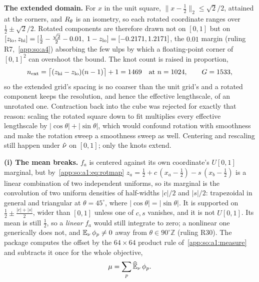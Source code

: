 \textbf{The extended domain.} For $x$ in the unit square,
$\|x-\tfrac12\|_2\le\sqrt2/2$, attained at the corners, and $R_\theta$ is an
isometry, so each rotated coordinate ranges over $\tfrac12\pm\sqrt2/2$.
Rotated components are therefore drawn not on $[0,1]$ but on
$[z_{\mathrm{lo}},z_{\mathrm{hi}}]
=[\tfrac12-\tfrac{\sqrt2}{2}-0.01,\;1-z_{\mathrm{lo}}]
=[-0.2171,1.2171]$, the $0.01$ margin (ruling R7,~\ref{app:so:a4})
absorbing the few ulps by which a floating-point corner of ${[0,1]}^2$ can
overshoot the bound. The knot count is raised in proportion,
\begin{equation}\label{app:so:a1:eq:next}
  n_{\mathrm{ext}}=\bigl\lceil(z_{\mathrm{hi}}-z_{\mathrm{lo}})(n-1)\bigr\rceil+1
       =1469
  \quad\text{at }n=1024,
  \qquad G=1533,
\end{equation}
so the extended grid's spacing is no coarser than the unit grid's and a
rotated component keeps the resolution, and hence the effective lengthscale,
of an unrotated one. Contraction back into the cube was rejected for exactly
that reason: scaling the rotated square down to fit multiplies every effective
lengthscale by $|\cos\theta|+|\sin\theta|$, which would confound rotation with
smoothness and make the rotation sweep a smoothness sweep as well. Centering
and rescaling still happen under $\hat\nu$ on $[0,1]$; only the knots extend.

\textbf{(i) The mean breaks.} $f_a$ is centered against its own coordinate's
$U[0,1]$ marginal, but by~\eqref{app:so:a1:eq:rotmap}
$z_a=\tfrac12+c\,(x_a-\tfrac12)-s\,(x_b-\tfrac12)$ is a linear combination of
two independent uniforms, so its marginal is the convolution of two uniform
densities of half-widths $|c|/2$ and $|s|/2$: trapezoidal in general and
triangular at $\theta=45^\circ$, where $|\cos\theta|=|\sin\theta|$. It is
supported on $\tfrac12\pm\tfrac{|c|+|s|}{2}$, wider than $[0,1]$ unless one of
$c,s$ vanishes, and it is not $U[0,1]$. Its mean is still $\tfrac12$, so a
\emph{linear} $f_a$ would still integrate to zero; a nonlinear one generically
does not, and $\operatorname{\mathbb{E}}_\nu\phi_p\neq0$ away from $\theta\in90^\circ\mathbb{Z}$ (ruling
R30). The package computes the offset by the $64\times64$ product rule
of~\ref{app:so:a1:measure} and subtracts it once for the whole objective,
\begin{equation}\label{app:so:a1:eq:mu}
  \mu=\sum_p\operatorname{\widehat{\mathbb{E}}}_\nu\phi_p .
\end{equation}


